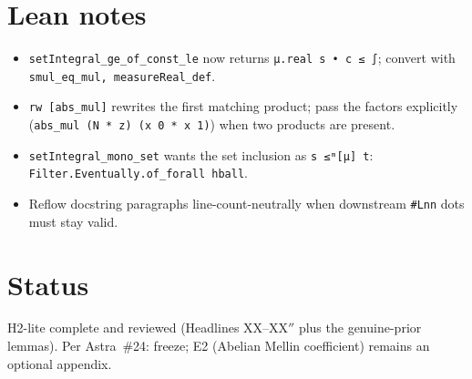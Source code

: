 \documentclass[11pt]{article}
\begin{document}
\section{Lean notes}
\begin{itemize}
\item \texttt{setIntegral\_ge\_of\_const\_le} now returns \texttt{μ.real s • c ≤ ∫}; convert with
  \texttt{smul\_eq\_mul, measureReal\_def}.
\item \texttt{rw [abs\_mul]} rewrites the first matching product; pass the factors explicitly
  (\texttt{abs\_mul (N * z) (x 0 * x 1)}) when two products are present.
\item \texttt{setIntegral\_mono\_set} wants the set inclusion as \texttt{s ≤ᵐ[μ] t}:
  \texttt{Filter.Eventually.of\_forall hball}.
\item Reflow docstring paragraphs line-count-neutrally when downstream \texttt{\#Lnn} dots must stay valid.
\end{itemize}

\section{Status}
H2-lite complete and reviewed (Headlines XX--XX$''$ plus the genuine-prior lemmas). Per Astra~\#24:
freeze; E2 (Abelian Mellin coefficient) remains an optional appendix.
\end{document}
